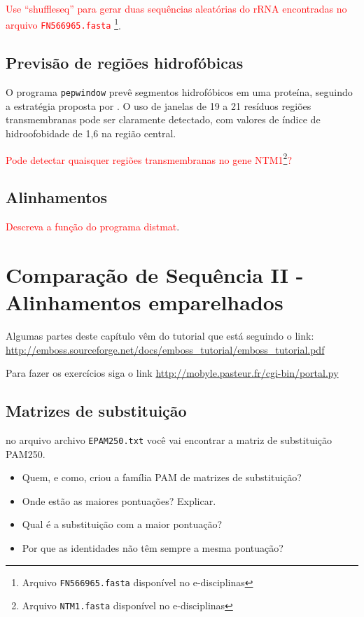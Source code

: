 \documentclass[letter,11pt]{book}
\begin{document}
\textcolor{red}{Use ``shuffleseq'' para gerar duas sequências aleatórias do rRNA encontradas no arquivo \Verb+FN566965.fasta+ \footnote{Arquivo \Verb+FN566965.fasta+ disponível no e-disciplinas}}.

\section{Previsão de regiões hidrofóbicas} O programa \Verb+pepwindow+ prevê segmentos hidrofóbicos em uma proteína, seguindo a estratégia proposta por \citep{Kyte1982}. O uso de janelas de 19 a 21 resíduos regiões transmembranas pode ser claramente detectado, com valores de índice de hidroofobidade de 1,6 na região central.

\textcolor{red}{Pode detectar quaisquer regiões transmembranas no gene NTM1\footnote{Arquivo \Verb+NTM1.fasta+ disponível no e-disciplinas}?}

\section{Alinhamentos}

\textcolor{red}{Descreva a função do programa distmat}.

\chapter{Comparação de Sequência II - Alinhamentos emparelhados}

Algumas partes deste capítulo vêm do tutorial que está seguindo o link: \url{http://emboss.sourceforge.net/docs/emboss_tutorial/emboss_tutorial.pdf}

Para fazer os exercícios siga o link \url{http://mobyle.pasteur.fr/cgi-bin/portal.py}

\section{Matrizes de substituição}

no arquivo archivo \Verb+EPAM250.txt+ você vai encontrar a matriz de substituição PAM250.


{
\color{red}
\begin{itemize}
\item Quem, e como, criou a família PAM de matrizes de substituição?
\item Onde estão as maiores pontuações? Explicar.
\item Qual é a substituição com a maior pontuação?
\item Por que as identidades não têm sempre a mesma pontuação?
\end{itemize}

}
\end{document}
